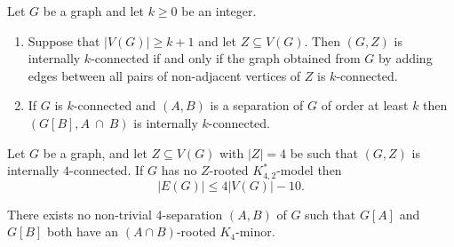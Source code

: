 \documentclass[10pt,a4paper]{amsart}
\begin{document}
\begin{obs}\label{o:intConnect} Let $G$ be a graph and let  $k \geq 0$ be an integer.	
	 \begin{enumerate}  
		\item Suppose that $|V(G)| \geq k+1$ and let $Z \subseteq V(G)$. Then $(G,Z)$ is internally  $k$-connected if and only if the graph obtained from $G$ by adding edges between all pairs of non-adjacent vertices of $Z$ is $k$-connected.
		\item If $G$ is $k$-connected and $(A,B)$ is a separation of $G$ of order at least $k$ then $(G[B],A~\cap~B)$ is internally $k$-connected. 
	\end{enumerate}	
\end{obs}

 \begin{lem}\label{l:K42star}
	Let $G$ be a graph, and let $Z \subseteq V(G)$ with $|Z|=4$ be such that $(G,Z)$ is internally $4$-connected. If $G$ has no $Z$-rooted $K^*_{4,2}$-model then $$|E(G)| \leq 4|V(G)|-10.$$ 
\end{lem}

\begin{claim}\label{c:no4sep2K4} There exists no non-trivial $4$-separation $(A,B)$ of $G$ such that $G[A]$ and $G[B]$ both have an $(A \cap B)$-rooted $K_4$-minor.
\end{claim}	
\end{document}
